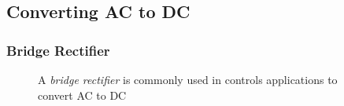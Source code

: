 %                     
%                     

\subsection{Converting AC to DC}

\begin{frame}
    \frametitle{Bridge Rectifier}

    \begin{figure}
        \centering
        \resizebox{0.48\linewidth}{!}{
            
        }

        {\footnotesize A \emph{bridge rectifier} is commonly used in controls applications to convert AC to DC}

    \end{figure}

\end{frame}

